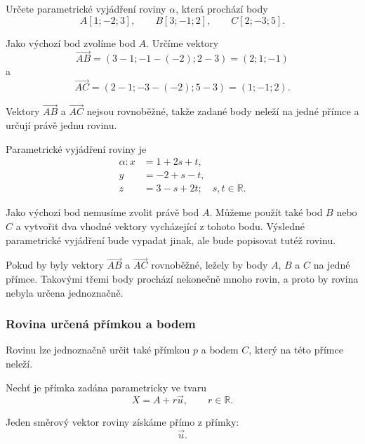 \begin{example}
    \label{exa:Plane_through_three_points}

    Určete parametrické vyjádření roviny $\alpha$, která prochází body
    \[
        A[1;-2;3],
        \qquad
        B[3;-1;2],
        \qquad
        C[2;-3;5].
    \]

    Jako výchozí bod zvolíme bod $A$. Určíme vektory
    \[
        \overrightarrow{AB}
        =
        (3-1;-1-(-2);2-3)
        =
        (2;1;-1)
    \]
    a
    \[
        \overrightarrow{AC}
        =
        (2-1;-3-(-2);5-3)
        =
        (1;-1;2).
    \]

    Vektory $\overrightarrow{AB}$ a $\overrightarrow{AC}$ nejsou
    rovnoběžné, takže zadané body neleží na jedné přímce a určují
    právě jednu rovinu.

    Parametrické vyjádření roviny je
    \[
        \begin{aligned}
            \alpha: x&=1+2s+t,\\
            y&=-2+s-t,\\
            z&=3-s+2t; \quad s,t\in\mathbb{R}.
        \end{aligned}
    \]
\end{example}

\begin{remark}
    Jako výchozí bod nemusíme zvolit právě bod $A$. Můžeme použít
    také bod $B$ nebo $C$ a vytvořit dva vhodné vektory vycházející
    z tohoto bodu. Výsledné parametrické vyjádření bude vypadat jinak,
    ale bude popisovat tutéž rovinu.
\end{remark}

Pokud by byly vektory $\overrightarrow{AB}$ a $\overrightarrow{AC}$
rovnoběžné, ležely by body $A$, $B$ a $C$ na jedné přímce. Takovými
třemi body prochází nekonečně mnoho rovin, a proto by rovina nebyla
určena jednoznačně.


\subsubsection{Rovina určená přímkou a bodem}
\label{subsubsec:Plane_line_and_point}

Rovinu lze jednoznačně určit také přímkou $p$ a bodem $C$, který
na této přímce neleží.

Nechť je přímka zadána parametricky ve tvaru
\[
    X=A+r\vec{u},
    \qquad
    r\in\mathbb{R}.
\]

Jeden směrový vektor roviny získáme přímo z přímky:
\[
    \vec{u}.
\]

